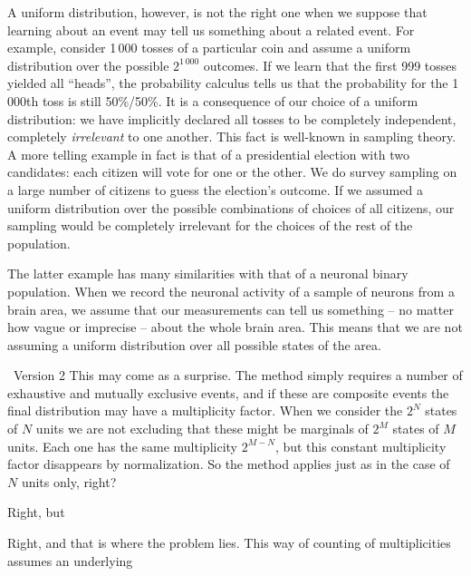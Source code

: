 \documentclass{article}
\theoremstyle{remark}
\theoremstyle{innote}
\renewcommand*{\|}{\mathpunct{|}}%
\theoremstyle{simple}
\newcommand*{\puzzle}{{\fontencoding{U}\fontfamily{fontawesometwo}\selectfont\symbol{225}}}
\newcommand{\mynote}[1]{ {\color{notecolour}\puzzle\ #1}}
\begin{document}
A uniform distribution, however, is not the right one when we suppose that
learning about an event may tell us something about a related event. For
example, consider 1\,000 tosses of a particular coin and assume a uniform
distribution over the possible $2^{1\,000}$ outcomes. If we learn that the
first 999 tosses yielded all \enquote{heads}, the probability calculus
tells us that the probability for the 1\,000th toss is still 50\%/50\%. It
is a consequence of our choice of a uniform distribution: we have
implicitly declared all tosses to be completely independent, completely
\emph{irrelevant} to one another. This fact is well-known in sampling
theory. A more telling example in fact is that of a presidential election
with two candidates: each citizen will vote for one or the other. We do
survey sampling on a large number of citizens to guess the election's
outcome. If we assumed a uniform distribution over the possible
combinations of choices of all citizens, our sampling would be completely
irrelevant for the choices of the rest of the population.




The latter example has many similarities with that of a neuronal binary
population. When we record the neuronal activity of a sample of neurons from a
brain area, we assume that our measurements can tell us something -- no
matter how vague or imprecise -- about the whole brain area. This means
that we are not assuming a uniform distribution over all possible states of
the area.




\mynote{Version 2}
This may come as a surprise. The method simply requires a number of
exhaustive and mutually exclusive events, and if these are composite events
the final distribution may have a multiplicity factor. When we consider the
$2^{N}$ states of $N$ units we are not excluding that these might be
marginals of $2^{M}$ states of $M$ units. Each one has the same
multiplicity $2^{M-N}$, but this constant multiplicity factor disappears
by normalization. So the method applies just as in the case of $N$ units
only, right?

Right, but 

Right, and that is where the problem lies. This way of counting of
multiplicities assumes an underlying 
\end{document}
